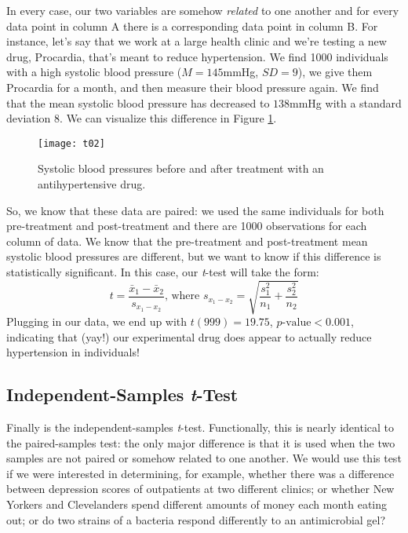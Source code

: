 In every case, our two variables are somehow \textit{related} to one another and for every data point in column A there is a corresponding data point in column B. For instance, let's say that we work at a large health clinic and we're testing a new drug, Procardia, that's meant to reduce hypertension. We find 1000 individuals with a high systolic blood pressure ($M=145$mmHg, $SD=9$), we give them Procardia for a month, and then measure their blood pressure again. We find that the mean systolic blood pressure has decreased to $138$mmHg with a standard deviation $8$. We can visualize this difference in Figure \ref{fig:t02}.

\begin{figure}[h]
\texttt{[image: t02]}
\label{fig:t02}
\caption{Systolic blood pressures before and after treatment with an antihypertensive drug.}
\end{figure}

So, we know that these data are paired: we used the same individuals for both pre-treatment and post-treatment and there are 1000 observations for each column of data. We know that the pre-treatment and post-treatment mean systolic blood pressures are different, but we want to know if this difference is statistically significant. In this case, our \textit{t}-test will take the form:
\begin{equation}
t=\frac{\bar{x}_1-\bar{x}_2}{s_{x_1-x_2}}\text{, where }s_{x_1-x_2}=\sqrt{\frac{s_1^2}{n_1}+\frac{s_2^2}{n_2}}
\end{equation}
Plugging in our data, we end up with $t(999)=19.75$, $p\text{-value}<0.001$, indicating that (yay!) our experimental drug does appear to actually reduce hypertension in individuals!

\subsection{Independent-Samples \textit{t}-Test}

Finally is the independent-samples \textit{t}-test. Functionally, this is nearly identical to the paired-samples test: the only major difference is that it is used when the two samples are not paired or somehow related to one another. We would use this test if we were interested in determining, for example, whether there was a difference between depression scores of outpatients at two different clinics; or whether New Yorkers and Clevelanders spend different amounts of money each month eating out; or do two strains of a bacteria respond differently to an antimicrobial gel?

